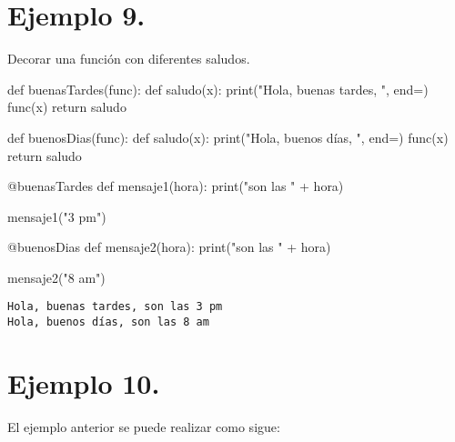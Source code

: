\documentclass[
  letterpaper,
  DIV=11,
  numbers=noendperiod]{scrreprt}
\newenvironment{Shaded}{\begin{snugshade}}{\end{snugshade}}
\newcommand{\AttributeTok}[1]{\textcolor[rgb]{0.40,0.45,0.13}{#1}}
\newcommand{\BuiltInTok}[1]{\textcolor[rgb]{0.00,0.23,0.31}{#1}}
\newcommand{\ControlFlowTok}[1]{\textcolor[rgb]{0.00,0.23,0.31}{#1}}
\newcommand{\KeywordTok}[1]{\textcolor[rgb]{0.00,0.23,0.31}{#1}}
\newcommand{\NormalTok}[1]{\textcolor[rgb]{0.00,0.23,0.31}{#1}}
\newcommand{\OperatorTok}[1]{\textcolor[rgb]{0.37,0.37,0.37}{#1}}
\newcommand{\StringTok}[1]{\textcolor[rgb]{0.13,0.47,0.30}{#1}}
\begin{document}
\section{\texorpdfstring{\textbf{Ejemplo
9.}}{Ejemplo 9.}}\label{ejemplo-9.-3}

Decorar una función con diferentes saludos.

\begin{Shaded}
\begin{Highlighting}[]
\KeywordTok{def}\NormalTok{ buenasTardes(func):}
    \KeywordTok{def}\NormalTok{ saludo(x):}
        \BuiltInTok{print}\NormalTok{(}\StringTok{"Hola, buenas tardes, "}\NormalTok{, end}\OperatorTok{=}\StringTok{\textquotesingle{}\textquotesingle{}}\NormalTok{)}
\NormalTok{        func(x)}
    \ControlFlowTok{return}\NormalTok{ saludo}

\KeywordTok{def}\NormalTok{ buenosDias(func):}
    \KeywordTok{def}\NormalTok{ saludo(x):}
        \BuiltInTok{print}\NormalTok{(}\StringTok{"Hola, buenos días, "}\NormalTok{, end}\OperatorTok{=}\StringTok{\textquotesingle{}\textquotesingle{}}\NormalTok{)}
\NormalTok{        func(x)}
    \ControlFlowTok{return}\NormalTok{ saludo}

\AttributeTok{@buenasTardes}
\KeywordTok{def}\NormalTok{ mensaje1(hora):}
    \BuiltInTok{print}\NormalTok{(}\StringTok{"son las "} \OperatorTok{+}\NormalTok{ hora)}

\NormalTok{mensaje1(}\StringTok{"3 pm"}\NormalTok{)}

\AttributeTok{@buenosDias}
\KeywordTok{def}\NormalTok{ mensaje2(hora):}
    \BuiltInTok{print}\NormalTok{(}\StringTok{"son las "} \OperatorTok{+}\NormalTok{ hora)}
    
\NormalTok{mensaje2(}\StringTok{"8 am"}\NormalTok{)}
\end{Highlighting}
\end{Shaded}

\begin{verbatim}
Hola, buenas tardes, son las 3 pm
Hola, buenos días, son las 8 am
\end{verbatim}

\section{\texorpdfstring{\textbf{Ejemplo
10.}}{Ejemplo 10.}}\label{ejemplo-10.-2}

El ejemplo anterior se puede realizar como sigue:
\end{document}

